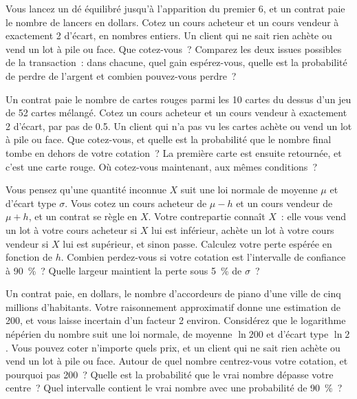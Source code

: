 \begin{question}\label{iq:iv2:making-a-market:8}
Vous lancez un dé équilibré jusqu'à l'apparition du premier 6, et un contrat paie le nombre de lancers en dollars. Cotez un cours acheteur et un cours vendeur à exactement 2 d'écart, en nombres entiers. Un client qui ne sait rien achète ou vend un lot à pile ou face. Que cotez-vous~? Comparez les deux issues possibles de la transaction~: dans chacune, quel gain espérez-vous, quelle est la probabilité de perdre de l'argent et combien pouvez-vous perdre~?
\end{question}

\begin{question}\label{iq:iv2:making-a-market:9}
Un contrat paie le nombre de cartes rouges parmi les 10 cartes du dessus d'un jeu de 52 cartes mélangé. Cotez un cours acheteur et un cours vendeur à exactement 2 d'écart, par pas de 0.5. Un client qui n'a pas vu les cartes achète ou vend un lot à pile ou face. Que cotez-vous, et quelle est la probabilité que le nombre final tombe en dehors de votre cotation~? La première carte est ensuite retournée, et c'est une carte rouge. Où cotez-vous maintenant, aux mêmes conditions~?
\end{question}

\begin{question}\label{iq:iv2:making-a-market:10}
Vous pensez qu'une quantité inconnue $X$ suit une loi normale de moyenne $\mu$ et d'écart type $\sigma$. Vous cotez un cours acheteur de $\mu - h$ et un cours vendeur de $\mu + h$, et un contrat se règle en $X$. Votre contrepartie connaît $X$~: elle vous vend un lot à votre cours acheteur si $X$ lui est inférieur, achète un lot à votre cours vendeur si $X$ lui est supérieur, et sinon passe. Calculez votre perte espérée en fonction de $h$. Combien perdez-vous si votre cotation est l'intervalle de confiance à 90~\%~? Quelle largeur maintient la perte sous 5~\% de $\sigma$~?
\end{question}

\begin{question}\label{iq:iv2:making-a-market:11}
Un contrat paie, en dollars, le nombre d'accordeurs de piano d'une ville de cinq millions d'habitants. Votre raisonnement approximatif donne une estimation de 200, et vous laisse incertain d'un facteur 2 environ. Considérez que le logarithme népérien du nombre suit une loi normale, de moyenne $\ln 200$ et d'écart type $\ln 2$. Vous pouvez coter n'importe quels prix, et un client qui ne sait rien achète ou vend un lot à pile ou face. Autour de quel nombre centrez-vous votre cotation, et pourquoi pas 200~? Quelle est la probabilité que le vrai nombre dépasse votre centre~? Quel intervalle contient le vrai nombre avec une probabilité de 90~\%~?
\end{question}

